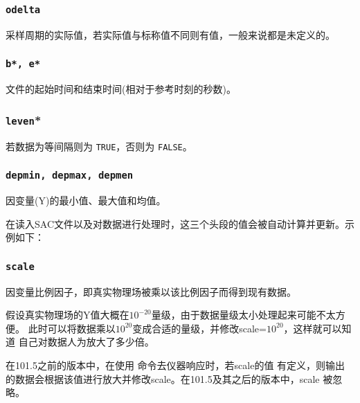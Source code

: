 \subsubsection{\texttt{odelta}}
采样周期的实际值，若实际值与标称值不同则有值，一般来说都是未定义的。

\subsubsection{\texttt{b*, e*}}
文件的起始时间和结束时间(相对于参考时刻的秒数)。

\subsubsection{\texttt{leven}*}
若数据为等间隔则为 \texttt{TRUE}，否则为 \texttt{FALSE}。

\subsubsection{\texttt{depmin, depmax, depmen}}
因变量(Y)的最小值、最大值和均值。

在读入SAC文件以及对数据进行处理时，这三个头段的值会被自动计算并更新。示例如下：

\subsubsection{\texttt{scale}}
因变量比例因子，即真实物理场被乘以该比例因子而得到现有数据。

假设真实物理场的Y值大概在$10^{-20}$量级，由于数据量级太小处理起来可能不太方便。
此时可以将数据乘以$10^{20}$变成合适的量级，并修改scale=$10^{20}$，这样就可以知道
自己对数据人为放大了多少倍。

在101.5之前的版本中，在使用  命令去仪器响应时，若scale的值
有定义，则输出的数据会根据该值进行放大并修改scale。在101.5及其之后的版本中，scale
被忽略。

